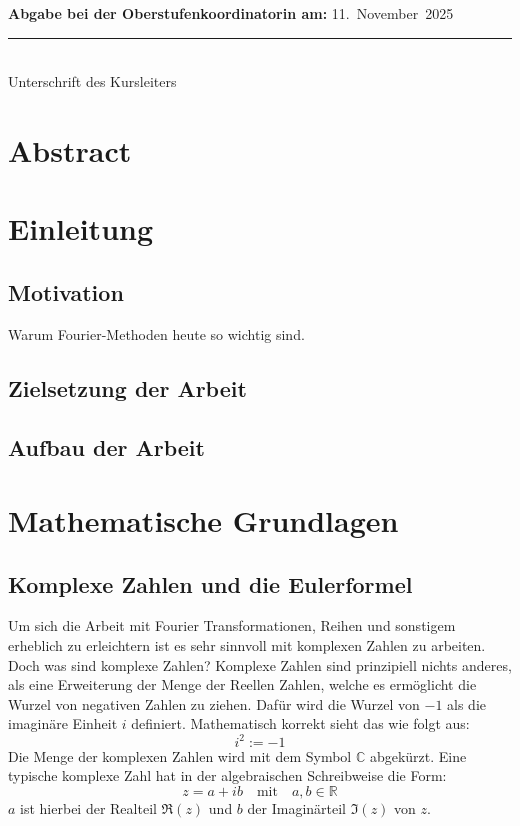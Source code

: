\documentclass[a4paper,12pt]{article}
\theoremstyle{definition}
\theoremstyle{remark}
\begin{document}
\begin{center}
\begin{flushleft}
\vspace{0.8cm}

\textbf{Abgabe bei der Oberstufenkoordinatorin am:} 11.\ November\ 2025
\end{flushleft}

\vfill

\begin{flushright}
\rule{5cm}{0.4pt}\\
Unterschrift des Kursleiters
\end{flushright}

\end{center}

\renewcommand{\contentsname}{Inhaltsverzeichnis}
\tableofcontents

\section{Abstract}

\section{Einleitung}
\subsection{Motivation}
Warum Fourier-Methoden heute so wichtig sind.
\subsection{Zielsetzung der Arbeit}
\subsection{Aufbau der Arbeit}

\section{Mathematische Grundlagen}
\subsection{Komplexe Zahlen und die Eulerformel}
Um sich die Arbeit mit Fourier Transformationen, Reihen und sonstigem erheblich zu erleichtern ist es sehr sinnvoll mit komplexen Zahlen zu arbeiten. Doch was sind komplexe Zahlen? 
Komplexe Zahlen sind prinzipiell nichts anderes, als eine Erweiterung der Menge der Reellen Zahlen, welche es ermöglicht die Wurzel von negativen Zahlen zu ziehen. Dafür wird die Wurzel von $-1$ als die imaginäre Einheit $i$ definiert. Mathematisch korrekt sieht das wie folgt aus:
$$i^2 := -1$$
Die Menge der komplexen Zahlen wird mit dem Symbol $\mathbb{C}$ abgekürzt. Eine typische komplexe Zahl hat in der algebraischen Schreibweise die Form:
$$ z = a + ib \quad \text{mit} \quad a,b \in \mathbb{R} $$
$a$ ist hierbei der Realteil $\Re(z)$ und $b$ der Imaginärteil $\Im(z)$ von $z$. \vspace{1em}
\end{document}
